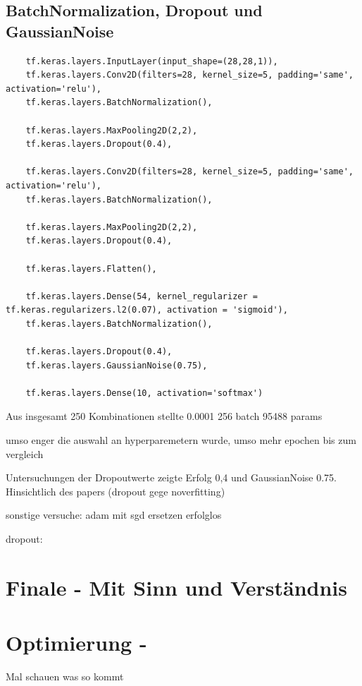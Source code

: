 \documentclass[
fontsize=12pt,					%
paper=a4,						%
twoside=true, 					%
listof=totoc, 					%
bibliography=totoc,				%
titlepage, 						%
headsepline, 					%
DIV=12,							%
BCOR=6mm,						%
cleardoublepage=empty,			%
parskip,							%
ngerman
]{scrartcl}
\begin{document}
\subsection{BatchNormalization, Dropout und GaussianNoise}

\begin{lstlisting}
	tf.keras.layers.InputLayer(input_shape=(28,28,1)),
	tf.keras.layers.Conv2D(filters=28, kernel_size=5, padding='same', activation='relu'),
	tf.keras.layers.BatchNormalization(),
	
	tf.keras.layers.MaxPooling2D(2,2),
	tf.keras.layers.Dropout(0.4),
	
	tf.keras.layers.Conv2D(filters=28, kernel_size=5, padding='same', activation='relu'),
	tf.keras.layers.BatchNormalization(),
	
	tf.keras.layers.MaxPooling2D(2,2),
	tf.keras.layers.Dropout(0.4),
	
	tf.keras.layers.Flatten(),
	
	tf.keras.layers.Dense(54, kernel_regularizer = tf.keras.regularizers.l2(0.07), activation = 'sigmoid'),
	tf.keras.layers.BatchNormalization(),
	
	tf.keras.layers.Dropout(0.4),
	tf.keras.layers.GaussianNoise(0.75),
	
	tf.keras.layers.Dense(10, activation='softmax')
\end{lstlisting}


Aus insgesamt 250 Kombinationen stellte 
0.0001
256 batch
95488  params

umso enger die auswahl an hyperparemetern wurde, umso mehr epochen bis zum vergleich

Untersuchungen der Dropoutwerte zeigte Erfolg 0,4 und GaussianNoise 0.75. Hinsichtlich des papers (dropout gege noverfitting) 

sonstige versuche: adam mit sgd ersetzen erfolglos



dropout:


\section{Finale - Mit Sinn und Verständnis}

\section{Optimierung - }

Mal schauen was so kommt
\end{document}
